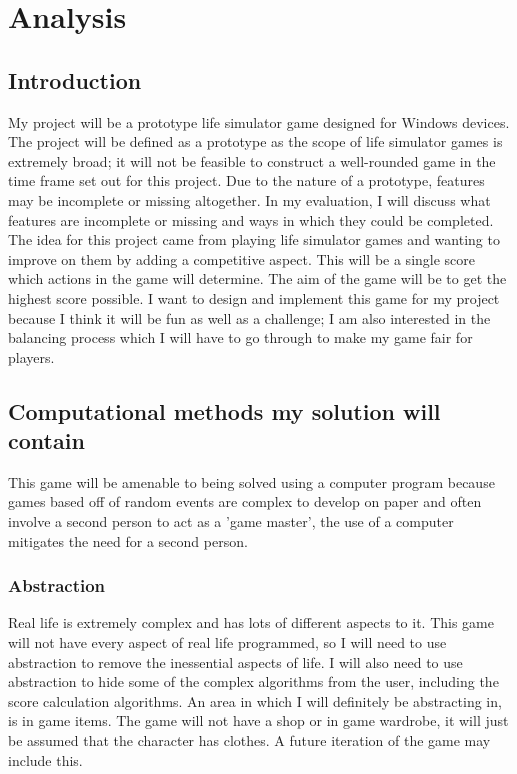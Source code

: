 \addtolength{\topmargin}{-1.59999pt}
\setlength{\headheight}{13.59999pt}

\chapter{Analysis}
\section{Introduction}
My project will be a prototype life simulator game designed for Windows devices.\\
The project will be defined as a prototype as the scope of life simulator games is extremely broad; it will not be feasible to construct a well-rounded game in the time frame set out for this project. Due to the nature of a prototype, features may be incomplete or missing altogether. In my evaluation, I will discuss what features are incomplete or missing and ways in which they could be completed.\\
The idea for this project came from playing life simulator games and wanting to improve on them by adding a competitive aspect. This will be a single score which actions in the game will determine. The aim of the game will be to get the highest score possible. I want to design and implement this game for my project because I think it will be fun as well as a challenge; I am also interested in the balancing process which I will have to go through to make my game fair for players.


\section{Computational methods my solution will contain}
This game will be amenable to being solved using a computer program because games based off of random events are complex to develop on paper and often involve a second person to act as a 'game master', the use of a computer mitigates the need for a second person.
\subsection{Abstraction}
Real life is extremely complex and has lots of different aspects to it. This game will not have every aspect of real life programmed, so I will need to use abstraction to remove the inessential aspects of life. I will also need to use abstraction to hide some of the complex algorithms from the user, including the score calculation algorithms. \newline
An area in which I will definitely be abstracting in, is in game items. The game will not have a shop or in game wardrobe, it will just be assumed that the character has clothes. A future iteration of the game may include this.
